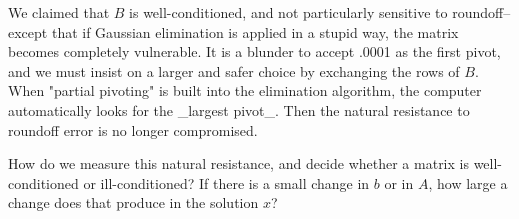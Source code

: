 We claimed that \(B\) is well-conditioned, and not particularly sensitive to roundoff--except that if Gaussian elimination is applied in a stupid way, the matrix becomes completely vulnerable. It is a blunder to accept .0001 as the first pivot, and we must insist on a larger and safer choice by exchanging the rows of \(B\). When "partial pivoting" is built into the elimination algorithm, the computer automatically looks for the _largest pivot_. Then the natural resistance to roundoff error is no longer compromised.

How do we measure this natural resistance, and decide whether a matrix is well-conditioned or ill-conditioned? If there is a small change in \(b\) or in \(A\), how large a change does that produce in the solution \(x\)? 